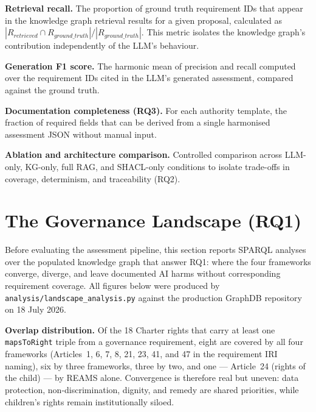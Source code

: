 \textbf{Retrieval recall.} The proportion of ground truth requirement IDs that appear in the knowledge graph retrieval results for a given proposal, calculated as $|R_{retrieved} \cap R_{ground\_truth}| / |R_{ground\_truth}|$. This metric isolates the knowledge graph's contribution independently of the LLM's behaviour.

\textbf{Generation F1 score.} The harmonic mean of precision and recall computed over the requirement IDs cited in the LLM's generated assessment, compared against the ground truth.

\textbf{Documentation completeness (RQ3).} For each authority template, the fraction of required fields that can be derived from a single harmonised assessment JSON without manual input.

\textbf{Ablation and architecture comparison.} Controlled comparison across LLM-only, KG-only, full RAG, and SHACL-only conditions to isolate trade-offs in coverage, determinism, and traceability (RQ2).


\section{The Governance Landscape (RQ1)}
\label{sec:landscape}

Before evaluating the assessment pipeline, this section reports SPARQL analyses over the populated knowledge graph that answer RQ1: where the four frameworks converge, diverge, and leave documented AI harms without corresponding requirement coverage. All figures below were produced by \texttt{analysis/landscape\_analysis.py} against the production GraphDB repository on 18 July 2026.

\begin{table}[htbp]
\centering
\caption{Requirement coverage per Charter right per framework, with incident evidence.}
\label{tab:coverage}

\end{table}

\textbf{Overlap distribution.} Of the 18 Charter rights that carry at least one \texttt{mapsToRight} triple from a governance requirement, eight are covered by all four frameworks (Articles~1, 6, 7, 8, 21, 23, 41, and 47 in the requirement IRI naming), six by three frameworks, three by two, and one --- Article~24 (rights of the child) --- by REAMS alone. Convergence is therefore real but uneven: data protection, non-discrimination, dignity, and remedy are shared priorities, while children's rights remain institutionally siloed.

